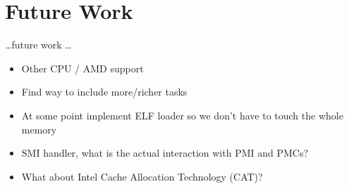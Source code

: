 \chapter{Future Work}
\label{sec:futurework}

\ldots future work \ldots

\begin{itemize}
    \item Other CPU / AMD support
    \item Find way to include more/richer tasks
    \item At some point implement ELF loader so we don't have to touch the whole memory
    \item SMI handler, what is the actual interaction with PMI and PMCs?
    \item What about Intel Cache Allocation Technology (CAT)?
\end{itemize}
\cleardoublepage
